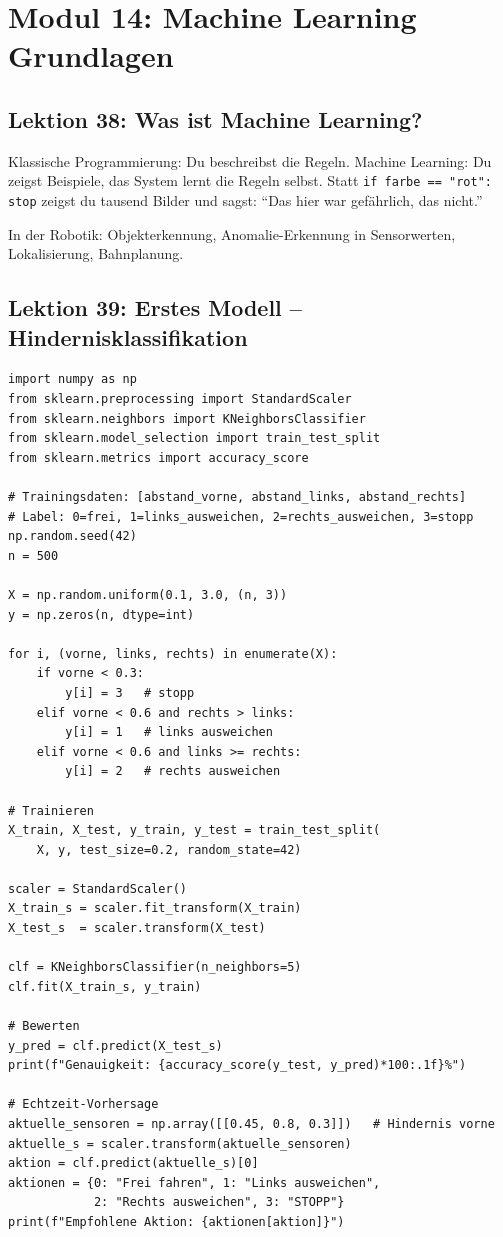 \chapter{Modul 14: Machine Learning Grundlagen}

\section{Lektion 38: Was ist Machine Learning?}

\begin{analogie}
Klassische Programmierung: Du beschreibst die Regeln. Machine Learning: Du zeigst Beispiele, das System lernt die Regeln selbst. Statt \texttt{if farbe == "rot": stop} zeigst du tausend Bilder und sagst: ``Das hier war gefährlich, das nicht.''
\end{analogie}

In der Robotik: Objekterkennung, Anomalie-Erkennung in Sensorwerten, Lokalisierung, Bahnplanung.

\section{Lektion 39: Erstes Modell -- Hindernisklassifikation}

\begin{lstlisting}
import numpy as np
from sklearn.preprocessing import StandardScaler
from sklearn.neighbors import KNeighborsClassifier
from sklearn.model_selection import train_test_split
from sklearn.metrics import accuracy_score

# Trainingsdaten: [abstand_vorne, abstand_links, abstand_rechts]
# Label: 0=frei, 1=links_ausweichen, 2=rechts_ausweichen, 3=stopp
np.random.seed(42)
n = 500

X = np.random.uniform(0.1, 3.0, (n, 3))
y = np.zeros(n, dtype=int)

for i, (vorne, links, rechts) in enumerate(X):
    if vorne < 0.3:
        y[i] = 3   # stopp
    elif vorne < 0.6 and rechts > links:
        y[i] = 1   # links ausweichen
    elif vorne < 0.6 and links >= rechts:
        y[i] = 2   # rechts ausweichen

# Trainieren
X_train, X_test, y_train, y_test = train_test_split(
    X, y, test_size=0.2, random_state=42)

scaler = StandardScaler()
X_train_s = scaler.fit_transform(X_train)
X_test_s  = scaler.transform(X_test)

clf = KNeighborsClassifier(n_neighbors=5)
clf.fit(X_train_s, y_train)

# Bewerten
y_pred = clf.predict(X_test_s)
print(f"Genauigkeit: {accuracy_score(y_test, y_pred)*100:.1f}%")

# Echtzeit-Vorhersage
aktuelle_sensoren = np.array([[0.45, 0.8, 0.3]])   # Hindernis vorne
aktuelle_s = scaler.transform(aktuelle_sensoren)
aktion = clf.predict(aktuelle_s)[0]
aktionen = {0: "Frei fahren", 1: "Links ausweichen",
            2: "Rechts ausweichen", 3: "STOPP"}
print(f"Empfohlene Aktion: {aktionen[aktion]}")
\end{lstlisting}

